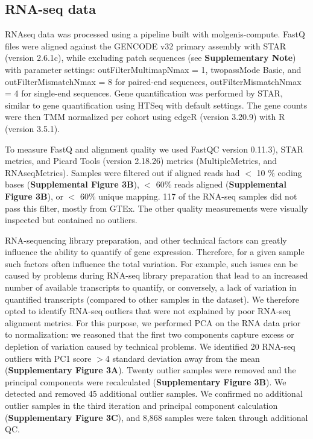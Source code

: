 \subsection{RNA-seq data}
RNAseq data was processed using a pipeline built with molgenis-compute\cite{byelasMOLGENISBasedComputational2011}. FastQ files were aligned against the GENCODE\cite{frankishGENCODEReferenceAnnotation2019} v32 primary assembly with STAR\cite{dobinSTARUltrafastUniversal2013} (version 2.6.1c), while excluding patch sequences (see \textbf{Supplementary Note}) with parameter settings: outFilterMultimapNmax = 1, twopassMode Basic, and outFilterMismatchNmax = 8 for paired-end sequences, outFilterMismatchNmax = 4 for single-end sequences. Gene quantification was performed by STAR, similar to gene quantification using HTSeq\cite{andersHTSeqPythonFramework2015} with default settings. The gene counts were then TMM\cite{robinsonScalingNormalizationMethod2010} normalized per cohort using edgeR\cite{robinsonEdgeRBioconductorPackage2010} (version 3.20.9) with R\cite{rcoreteamLanguageEnvironmentStatistical2017} (version 3.5.1). 

To measure FastQ and alignment quality we used FastQC\cite{BabrahamBioinformaticsFastQC} version 0.11.3), STAR\cite{dobinSTARUltrafastUniversal2013} metrics, and Picard Tools\cite{broadinstitutePicardTools2019} (version 2.18.26) metrics (MultipleMetrics, and RNAseqMetrics). Samples were filtered out if aligned reads had $<$ 10
\% coding bases (\textbf{Supplemental Figure 3B}), $<$ 60\% reads aligned (\textbf{Supplemental Figure 3B}), or $<$ 60\% unique mapping. 117 of the RNA-seq samples did not pass this filter, mostly from GTEx\cite{consortiumGTExConsortiumAtlas2020}. The other quality measurements were visually inspected but contained no outliers. 

RNA-sequencing library preparation, and other technical factors can greatly influence the ability to quantify of gene expression. Therefore, for a given sample such factors often influence the total variation. For example, such issues can be caused by problems during RNA-seq library preparation that lead to an increased number of available transcripts to quantify, or conversely, a lack of variation in quantified transcripts (compared to other samples in the dataset). We therefore opted to identify RNA-seq outliers that were not explained by poor RNA-seq alignment metrics. For this purpose, we performed PCA on the RNA data prior to normalization: we reasoned that the first two components capture excess or depletion of variation caused by technical problems. We identified 20 RNA-seq outliers with PC1 score $>$4 standard deviation away from the mean (\textbf{Supplementary Figure 3A}). Twenty outlier samples were removed and the principal components were recalculated  (\textbf{Supplementary Figure 3B}). We detected and removed 45 additional outlier samples. We confirmed no additional outlier samples in the third iteration and principal component calculation (\textbf{Supplementary Figure 3C}), and 8,868 samples were taken through additional QC. 

